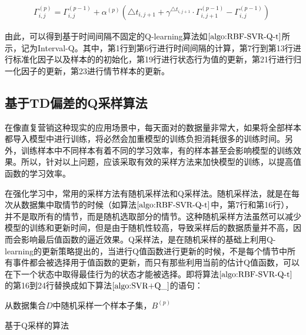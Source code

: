 \begin{equation}\label{seq:r_5}
\begin{aligned}
\Gamma^{(p)}_{i,j}=\Gamma^{(p-1)}_{i,j}+\alpha^{(p)}(\triangle t_{i,j+1} + \gamma^{\triangle t_{i,j+1}} \cdot \Gamma^{(p-1)}_{i,j+1}-\Gamma^{(p-1)}_{i,j})\;
\end{aligned}
\end{equation}

由此，可以得到基于时间间隔不固定的Q-learning算法如$\ref{algo:RBF-SVR-Q-t}$所示，记为Interval-Q。其中，第1行到第6行进行时间间隔的计算，第7行到第13行进行标准化因子以及样本的的初始化，第19行进行状态行为值的更新，第21行进行归一化因子的更新，第23进行情节样本的更新。

\subsection{基于TD偏差的Q采样算法}
在像直复营销这种现实的应用场景中，每天面对的数据量非常大，如果将全部样本都导入模型中进行训练，将必然会加重模型的训练负担消耗很多的训练时间。另外，训练样本中不同样本有着不同的学习效率，有的样本甚至会影响模型的训练效果。所以，针对以上问题，应该采取有效的采样方法来加快模型的训练，以提高值函数的学习效率。

在强化学习中，常用的采样方法有随机采样法\citep{tsitsiklis1994asynchronous}和Q采样法\citep{abe2002empirical}。随机采样法，就是在每次从数据集中取情节的时候（如算法$\ref{algo:RBF-SVR-Q-t}$中，第7行和第16行），并不是取所有的情节，而是随机选取部分的情节。这种随机采样方法虽然可以减少模型的训练和更新时间，但是由于随机性较高，导致采样后的数据质量并不高，因而会影响最后值函数的逼近效果。Q采样法，是在随机采样的基础上利用Q-learning的更新策略提出的，当进行Q值函数进行更新的时候，不是每个情节中所有事件都会被选择用于值函数的更新，而只有那些利用当前的估计Q值函数，可以在下一个状态中取得最佳行为的状态才能被选择。即将算法$\ref{algo:RBF-SVR-Q-t}$的第16到24行替换成如下算法$\ref{algo:SVR+Q_}$的语句：

\begin{algorithm}[htbp]
\small
\SetAlgoLined
{}
从数据集合$D$中随机采样一个样本子集，$B^{(p)}$\;
\caption{基于Q采样的算法}
\label{algo:SVR+Q_}
\end{algorithm}

